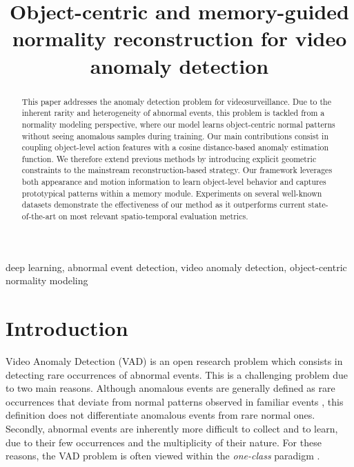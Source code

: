 \documentclass{article}
\title{Object-centric and memory-guided normality reconstruction for video anomaly detection}
\begin{document}
\maketitle
\begin{abstract}




This paper addresses the anomaly detection problem for videosurveillance. Due to the inherent rarity and heterogeneity of abnormal events, this problem is tackled from a normality modeling perspective, where our model learns object-centric normal patterns without seeing anomalous samples during training. Our main contributions consist in coupling object-level action features with a cosine distance-based anomaly estimation function. We therefore extend previous methods by introducing explicit geometric constraints to the mainstream reconstruction-based strategy. Our framework leverages both appearance and motion information to learn object-level behavior and captures prototypical patterns within a memory module.  Experiments on several well-known datasets demonstrate the effectiveness of our method as it outperforms current state-of-the-art on most relevant spatio-temporal evaluation metrics.


\begin{comment}
The abstract should appear at the top of the left-hand column of text, about
0.5 inch (12 mm) below the title area and no more than 3.125 inches (80 mm) in
length.  Leave a 0.5 inch (12 mm) space between the end of the abstract and the
beginning of the main text.  The abstract should contain about 100 to 150
words, and should be identical to the abstract text submitted electronically
along with the paper cover sheet.  All manuscripts must be in English, printed
in black ink.
\end{comment}
\end{abstract}
\begin{keywords}
deep learning, abnormal event detection, video anomaly detection, object-centric normality modeling
\end{keywords}
\section{Introduction}
\label{sec:intro}

Video Anomaly Detection (VAD) is an open research problem which consists in detecting rare occurrences of abnormal events. This is a challenging problem due to two main reasons. Although anomalous events are generally defined as rare occurrences that deviate from normal patterns observed in familiar events \cite{ramachandra2020survey}, this definition does not differentiate anomalous events from rare normal ones.
Secondly, abnormal events are inherently more difficult to collect and to learn, due to their few occurrences and the multiplicity of their nature. For these reasons, the VAD problem is often viewed within the \emph{one-class}\textbf{} paradigm \cite{pang20review}. 
\end{document}
